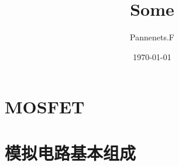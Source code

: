 \documentclass[en,11pt,english,black,simple,device=ppt]{elegantbook}
\title{Some}
\author{Pannenets.F}
\date{\today}
\begin{document}
\maketitle
\frontmatter

\section{MOSFET}




\section{模拟电路基本组成}



\mainmatter
\end{document}

